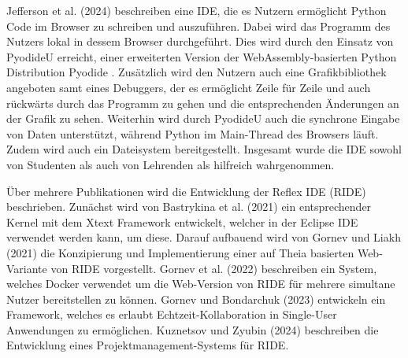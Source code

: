 Jefferson et al. (2024) \cite{PyodideU-2024} beschreiben eine IDE, die es Nutzern ermöglicht Python Code im Browser zu schreiben und auszuführen. Dabei wird das Programm des Nutzers lokal in dessem Browser durchgeführt. Dies wird durch den Einsatz von PyodideU erreicht, einer erweiterten Version der WebAssembly-basierten Python Distribution Pyodide \cite{Pyodide}. Zusätzlich wird den Nutzern auch eine Grafikbibliothek angeboten samt eines Debuggers, der es ermöglicht Zeile für Zeile und auch rückwärts durch das Programm zu gehen und die entsprechenden Änderungen an der Grafik zu sehen. Weiterhin wird durch PyodideU auch die synchrone Eingabe von Daten unterstützt, während Python im Main-Thread des Browsers läuft. Zudem wird auch ein Dateisystem bereitgestellt. Insgesamt wurde die IDE sowohl von Studenten als auch von Lehrenden als hilfreich wahrgenommen.

Über mehrere Publikationen wird die Entwicklung der Reflex IDE (RIDE) beschrieben.  Zunächst wird von Bastrykina et al. (2021)
ein entsprechender Kernel mit dem Xtext Framework entwickelt, welcher in der Eclipse IDE verwendet werden kann, um diese. Darauf aufbauend wird von Gornev und Liakh (2021)
die Konzipierung und Implementierung einer auf Theia basierten Web-Variante von RIDE vorgestellt. Gornev et al. (2022)
beschreiben ein System, welches Docker verwendet um die Web-Version von RIDE für mehrere simultane Nutzer bereitstellen zu können. Gornev und Bondarchuk (2023)
entwickeln ein Framework, welches es erlaubt Echtzeit-Kollaboration in Single-User Anwendungen zu ermöglichen. Kuznetsov und Zyubin (2024)
beschreiben die Entwicklung eines Projektmanagement-Systems für RIDE.